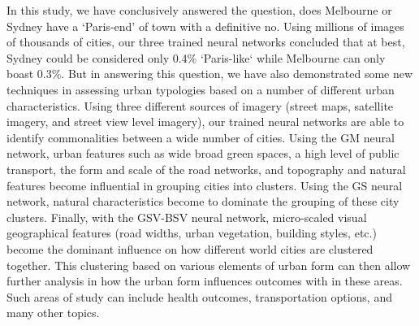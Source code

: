 \documentclass[sageh,times]{sagej}
\begin{document}
In this study, we have conclusively answered the question, does Melbourne or Sydney have a `Paris-end' of town with a definitive no. Using millions of images of thousands of cities, our three trained neural networks concluded that at best, Sydney could be considered only 0.4\% `Paris-like` while Melbourne can only boast 0.3\%. But in answering this question, we have also demonstrated some new techniques in assessing urban typologies based on a number of different urban characteristics. Using three different sources of imagery (street maps, satellite imagery, and street view level imagery), our trained neural networks are able to identify commonalities between a wide number of cities. Using the GM neural network, urban features such as wide broad green spaces, a high level of public transport, the form and scale of the road networks, and topography and natural features become influential in grouping cities into clusters. Using the GS neural network, natural characteristics become to dominate the grouping of these city clusters. Finally, with the GSV-BSV neural network, micro-scaled visual geographical features (road widths, urban vegetation, building styles, etc.) become the dominant influence on how different world cities are clustered together. This clustering based on various elements of urban form can then allow further analysis in how the urban form influences outcomes with in these areas. Such areas of study can include health outcomes, transportation options, and many other topics. 



  
  
\end{document}
